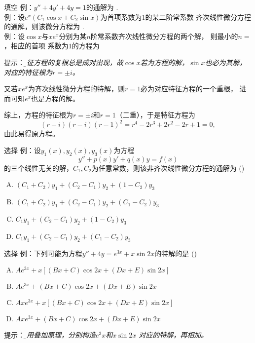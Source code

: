 \begin{frame}{填空}
	\linespread{1.5}
	\alert{例：}$y''+4y'+4y=1$的通解为
	\underline{\;}.\\[1em]
	
	\alert{例：}设$e^x(C_1\cos x+C_2\sin x)$为首项系数为$1$的某二阶常系数
	齐次线性微分方程的通解，则该微分方程为
	\underline{\;}.\\[1em]
	
	\alert{例：}设$\cos x$与$xe^x$分别为某$n$阶常系数齐次线性微分方程的两个解，
	则最小的$n=$\underline{\;}，相应的首项
	系数为$1$的方程为\underline{\uncover<5->{\;\b{$
	y^{(4)}-2y^{(3)}+2y''-2y'+y=0$}\;}}
	
\end{frame}

\begin{frame}
	\linespread{1.2}
	\pause\alert{提示：}\it\b 
	特征方程的复根总是成对出现，故$\cos x$若为方程的解，$\sin x$也必为其解，
	对应的特征根为$r=\pm i$。
	
	又若$xe^x$为齐次线性微分方程的特解，则$r=1$必为对应特征方程的一个重根，
	进而可知$e^x$也是方程的解。
	
	综上，方程的特征根为$r=\pm i$和$r=1$（二重），于是特征方程为
	$$(r+i)(r-i)(r-1)^2=r^4-2r^3+2r^2-2r+1=0,$$
	由此易得原方程。
\end{frame}

\begin{frame}{选择}
	\linespread{1.3}
	\alert{例：}设$y_1(x),y_2(x),y_3(x)$为方程
	$$y''+p(x)y'+q(x)y=f(x)$$
	的三个线性无关的解，$C_1,C_2$为任意常数，则该非齐次线性微分方程的通解为
	(\underline{\;})
	\begin{enumerate}[(A)]
	  \item $(C_1+C_2)y_1+(C_2-C_1)y_2+(1-C_2)y_3$
	  \item $(C_1+C_2)y_1+(C_2-C_1)y_2+(C_1-C_2)y_3$
	  \item $C_1y_1+(C_2-C_1)y_2+(1-C_2)y_3$
	  \item $C_1y_1+(C_2-C_1)y_2+(C_1-C_2)y_3$
	\end{enumerate}
\end{frame}

\begin{frame}{选择}
	\linespread{1.5}
	\alert{例：}下列可能为方程$y''+4y=e^{3x}+x\sin 2x$的特解的是
	(\underline{\;})
	\begin{enumerate}[(A)]
	  \item $Ae^{3x}+x[(Bx+C)\cos2x+(Dx+E)\sin2x]$
	  \item $Ae^{3x}+(Bx+C)\cos2x+(Dx+E)\sin2x$
	  \item $Axe^{3x}+x[(Bx+C)\cos2x+(Dx+E)\sin2x]$
	  \item $Axe^{3x}+(Bx+C)\cos2x+(Dx+E)\sin2x$
	\end{enumerate}
	\pause\alert{提示：}\it\b 利用叠加原理，分别构造$e^3x$和$x\sin2x$
	对应的特解，再相加。
\end{frame}

